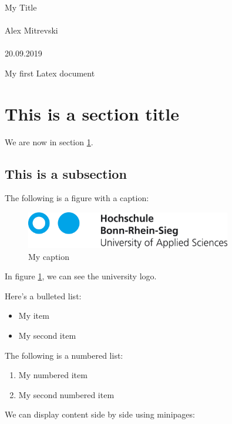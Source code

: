 \documentclass{article}
\begin{document}
    \begin{center}
        {\Huge My Title}\\~\\
        {\Large Alex Mitrevski}\\~\\
        {\Large 20.09.2019}
    \end{center}

    \tableofcontents

    \newpage

    My first Latex document

    \section{This is a section title}
    \label{sec:mysection}

    We are now in section \ref{sec:mysection}.

    \subsection{This is a subsection}

    The following is a figure with a caption:
    \begin{figure}[H]
        \centering
        \includegraphics[width=0.8\textwidth]{hbrs_logo.png}
        \caption{My caption}
        \label{fig:mycaption}
    \end{figure}

    In figure \ref{fig:mycaption}, we can see the university logo.

    Here's a bulleted list:
    \begin{itemize}
        \item My item
        \item My second item
    \end{itemize}

    The following is a numbered list:
    \begin{enumerate}
        \item My numbered item
        \item My second numbered item
    \end{enumerate}

    We can display content side by side using minipages:
\end{document}
